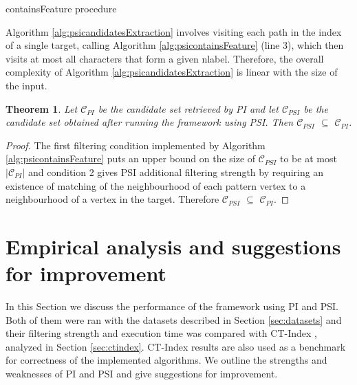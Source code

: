 \documentclass{l4proj}
\newtheorem{theorem}{Theorem}[section]
\newcommand{\fancyC}{\mathcal{C}}
\begin{document}
\begin{algorithm}
\centering
\caption{containsFeature procedure}
\label{alg:psicontainsFeature}
\begin{algorithmic}[1]
  
\EndIf
{} 
\EndIf
{} 
    \EndIf
\EndFor
{}
\EndProcedure
\end{algorithmic}
\end{algorithm}

Algorithm \ref{alg:psicandidatesExtraction} involves visiting each path in the index of a single target, calling Algorithm \ref{alg:psicontainsFeature} (line 3), which then visits at most all characters that form a given nlabel. Therefore, the overall complexity of Algorithm \ref{alg:psicandidatesExtraction} is linear with the size of the input.

\begin{theorem}
\label{psiisbettertheorem}
Let $\fancyC_{PI}$ be the candidate set retrieved by PI and let $\fancyC_{PSI}$ be the candidate set obtained after running the framework using PSI. Then $\fancyC_{PSI}$ $\subseteq$ $\fancyC_{PI}$.
\end{theorem}

\begin{proof}
The first filtering condition implemented by Algorithm \ref{alg:psicontainsFeature} puts an upper bound on the size of $\fancyC_{PSI}$ to be at most $|\fancyC_{PI}|$ and condition 2 gives PSI additional filtering strength by requiring an existence of matching of the neighbourhood of each pattern vertex to a neighbourhood of a vertex in the target. Therefore $\fancyC_{PSI}$ $\subseteq$ $\fancyC_{PI}$. 
\end{proof}

\section{Empirical analysis and suggestions for improvement}
In this Section we discuss the performance of the framework using PI and PSI. Both of them were ran with the datasets described in Section \ref{sec:datasets} and their filtering strength and execution time was compared with CT-Index \cite{ctindex}, analyzed in Section \ref{sec:ctindex}. CT-Index results are also used as a benchmark for correctness of the implemented algorithms. We outline the strengths and weaknesses of PI and PSI and give suggestions for improvement.
\end{document}
